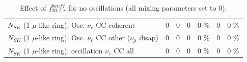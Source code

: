 \begin{table}
\begin{tabular}{| l | r | r | r  r | r  r |}
                          $N_{SK}$ (1 $\mu$-like ring): Osc. $\nu_e$ CC coherent &               0 &               0 &               0 &        0 \%  &               0 &        0 \%  \\ 
           $N_{SK}$ (1 $\mu$-like ring): Osc. $\nu_e$ CC other ($\nu_\mu$ disap) &               0 &               0 &               0 &        0 \%  &               0 &        0 \%  \\ 
                        $N_{SK}$ (1 $\mu$-like ring): oscillation $\nu_e$ CC all &               0 &               0 &               0 &        0 \%  &               0 &        0 \%  \\ 
\hline
\hline
\end{tabular}
\caption{ Effect of $f_{20; t, r}^{banff}$ for no oscillations (all mixing parameters set to 0). }
\label{tab:num_banff_ccqeE2_1RmuT_3f_osc_t13:0}
\end{table}
\clearpage
